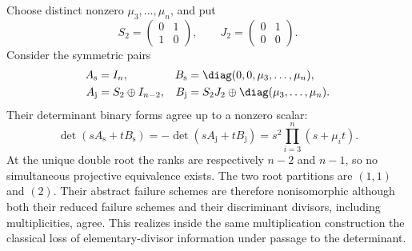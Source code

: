 \begin{example}
\label{ex:same-discriminant-distinct-failure}
Choose distinct nonzero \(\mu_3,\ldots,\mu_n\), and put
\[
 S_2=\begin{pmatrix}0&1\\1&0\end{pmatrix},\qquad
 J_2=\begin{pmatrix}0&1\\0&0\end{pmatrix}.
\]
Consider the symmetric pairs
\begin{align*}
 A_{\mathrm{s}}&=I_n,&
 B_{\mathrm{s}}&=\diag(0,0,\mu_3,\ldots,\mu_n),\\
 A_{\mathrm{j}}&=S_2\oplus I_{n-2},&
 B_{\mathrm{j}}&=S_2J_2\oplus\diag(\mu_3,\ldots,\mu_n).
\end{align*}
Their determinant binary forms agree up to a nonzero scalar:
\begin{equation}\label{eq:same-discriminant-pencils}
 \det(sA_{\mathrm{s}}+tB_{\mathrm{s}})
 =-\det(sA_{\mathrm{j}}+tB_{\mathrm{j}})
 =s^2\prod_{i=3}^n(s+\mu_i t).
\end{equation}
At the unique double root the ranks are respectively \(n-2\)
and \(n-1\), so no simultaneous projective equivalence exists.
The two root partitions are \((1,1)\) and \((2)\).
Their abstract failure schemes are therefore nonisomorphic although
both their reduced failure schemes and their discriminant divisors,
including multiplicities, agree.  This realizes inside the same
multiplication construction the classical loss of elementary-divisor
information under passage to the determinant.
\end{example}

